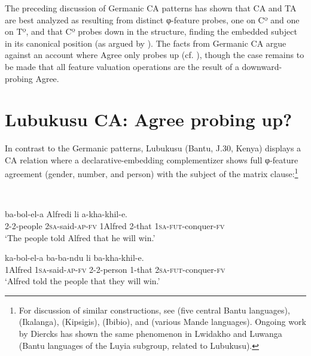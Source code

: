 \documentclass[output=paper
,modfonts
,nonflat
]{langsci/langscibook}
\begin{document}
The preceding discussion of Germanic CA patterns has shown that CA and TA are best analyzed as resulting from distinct φ-feature probes, one on Cº and one on Tº, and that Cº probes down in the structure, finding the embedded subject in its canonical position (as argued by \citealt{Carstens:2003,vanKoppen:2005,Haegeman:2012}). The facts from Germanic CA argue against an account where Agree only probes up (cf. \citealt{Zeijlstra:2012,Wurmbrand:2011,Bjorkman:toappearb}), though the case remains to be made that all feature valuation operations are the result of a downward-probing Agree. 

\section{Lubukusu CA: Agree probing up?} \label{LubukusuCA}

In contrast to the Germanic patterns, Lubukusu (Bantu, J.30, Kenya) displays a CA relation where a declarative-embedding complementizer shows full φ-feature agreement (gender, number, and person) with the subject of the matrix clause:\footnote{For discussion of similar constructions, see \citet{Kawasha:2007} (five central Bantu languages), \citet{LetsholoSafir:2017} (Ikalanga), \citet{DiercksRao:2017} (Kipsigis), \citet{Torrence:2016} (Ibibio), and \citet{Idiatov:2010} (various Mande languages). Ongoing work by Diercks has shown the same phenomenon in Lwidakho and Luwanga (Bantu languages of the Luyia subgroup, related to Lubukusu).}

\ea \label{FirstLubukusuExample}
 \\

\begin{xlist}

\ex
\gll {} ba-bol-el-a Alfredi li	a-kha-khil-e. \\
2-2-people 2\textsc{sa}-said-\textsc{ap}-\textsc{fv} 1Alfred 2-that 1\textsc{sa}-\textsc{fut}-conquer-\textsc{fv} \\
\glt `The people told Alfred that he will win.' 

\ex
\gll {} ka-bol-el-a ba-ba-ndu li ba-kha-khil-e. \\
1Alfred 1\textsc{sa}-said-\textsc{ap}-\textsc{fv} 2-2-person 1-that 2\textsc{sa}-\textsc{fut}-conquer-\textsc{fv} \\
\glt `Alfred told the people that they will win.'

\end{xlist}
\end{document}
